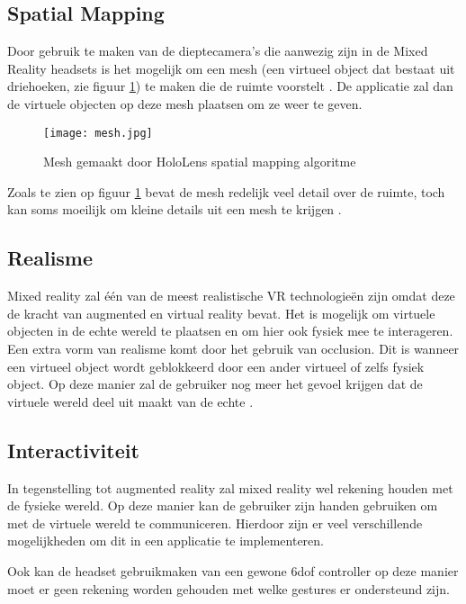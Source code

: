 
\subsection{Spatial Mapping}
Door gebruik te maken van de dieptecamera's die aanwezig zijn in de Mixed Reality headsets is het mogelijk om een mesh (een virtueel object dat bestaat uit driehoeken, zie figuur \ref{fig:mesh}) te maken die de ruimte voorstelt \autocite{Evans2017}. De applicatie zal dan de virtuele objecten op deze mesh plaatsen om ze weer te geven. 

\begin{figure}
    \texttt{[image: mesh.jpg]}
    \caption{Mesh gemaakt door HoloLens spatial mapping algoritme}
    \label{fig:mesh}
\end{figure}

Zoals te zien op figuur \ref{fig:mesh} bevat de mesh redelijk veel detail over de ruimte, toch kan soms moeilijk om kleine details uit een mesh te krijgen \autocite{Evans2017}.

\subsection{Realisme}
Mixed reality zal één van de meest realistische VR technologieën zijn omdat deze de kracht van augmented en virtual reality bevat. Het is mogelijk om virtuele objecten in de echte wereld te plaatsen en om hier ook fysiek mee te interageren. Een extra vorm van realisme komt door het gebruik van occlusion. Dit is wanneer een virtueel object wordt geblokkeerd door een ander virtueel of zelfs fysiek object. Op deze manier zal de gebruiker nog meer het gevoel krijgen dat de virtuele wereld deel uit maakt van de echte \autocite{Evans2017}.

\subsection{Interactiviteit}
In tegenstelling tot augmented reality zal mixed reality wel rekening houden met de fysieke wereld. Op deze manier kan de gebruiker zijn handen gebruiken om met de virtuele wereld te communiceren. Hierdoor zijn er veel verschillende mogelijkheden om dit in een applicatie te implementeren.

Ook kan de headset gebruikmaken van een gewone \acrshort{6dof} controller op deze manier moet er geen rekening worden gehouden met welke gestures er ondersteund zijn.

